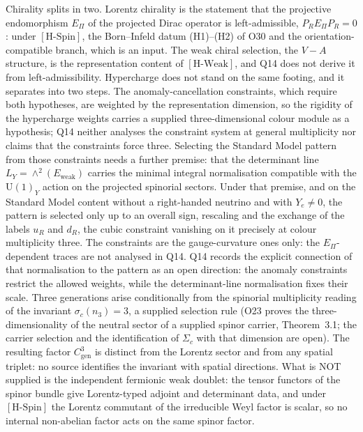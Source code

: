 \documentclass[11pt,a4paper]{article}
\theoremstyle{definition}
\newcommand{\UU}{\mathrm{U}}
\newcommand{\Epi}{E_\Pi}
\newcommand{\Cgen}{C^3_{\mathrm{gen}}}
\newcommand{\Ew}{E_{\mathrm{weak}}}
\newcommand{\HSpin}{\ensuremath{[\mathrm{H\text{-}Spin}]}}
\newcommand{\HWeak}{\ensuremath{[\mathrm{H\text{-}Weak}]}}
\begin{document}
    Chirality splits in two.
    Lorentz chirality is the statement that the projective endomorphism $\Epi$ of the projected Dirac operator is
    left-admissible, $P_R \Epi P_R = 0$: under \HSpin{}, the Born--Infeld datum (H1)--(H2) of O30 and the
    orientation-compatible branch, which is an input.
    The weak chiral selection, the $V-A$ structure, is the representation content of \HWeak{}, and Q14 does not
    derive it from left-admissibility.
    Hypercharge does not stand on the same footing, and it separates into two steps.
    The anomaly-cancellation constraints, which require both hypotheses, are weighted by the representation
    dimension, so the rigidity of the hypercharge weights carries a supplied three-dimensional colour module as a
    hypothesis; Q14 neither analyses the constraint system at general multiplicity nor claims that
    the constraints force three.
    Selecting the Standard Model pattern from those constraints needs a further premise: that the
    determinant line $L_Y = \wedge^2(\Ew)$ carries the minimal integral normalisation
    compatible with the $\UU(1)_Y$ action on the projected spinorial sectors.
    Under that premise, and on the Standard Model content without a right-handed neutrino and with $Y_e \neq 0$, the
    pattern is selected only up to an overall sign, rescaling and the exchange of the labels $u_R$ and $d_R$, the
    cubic constraint vanishing on it precisely at colour multiplicity three.
    The constraints are the gauge-curvature ones only: the $\Epi$-dependent traces are not analysed in Q14.
    Q14 records the explicit connection of that normalisation to the pattern as an open direction:
    the anomaly constraints restrict the allowed weights, while the determinant-line normalisation
    fixes their scale.
    Three generations arise conditionally from the spinorial multiplicity reading of the invariant
    $\sigma_c(n_3) = 3$, a supplied selection rule (O23 proves the three-dimensionality of the neutral sector of a
    supplied spinor carrier, Theorem~3.1; the carrier selection and the identification of $\Sigma_c$ with
    that dimension are open).
    The resulting factor $\Cgen$ is distinct from the Lorentz sector and from any spatial triplet: no source
    identifies the invariant with spatial directions.
    What is NOT supplied is the independent fermionic weak doublet: the tensor functors of the
    spinor bundle give Lorentz-typed adjoint and determinant data, and under \HSpin{} the Lorentz commutant of the
    irreducible Weyl factor is scalar, so no internal non-abelian factor acts on the same spinor factor.
\end{document}
